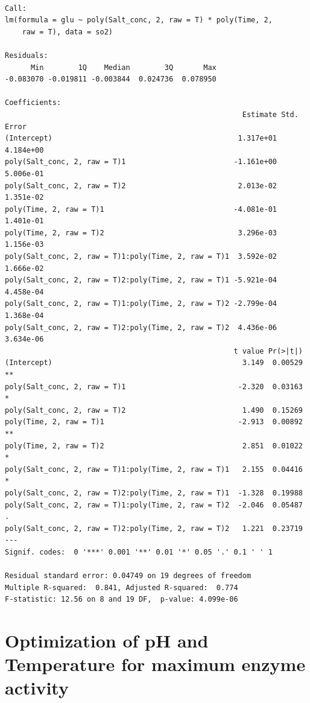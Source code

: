 \documentclass[
  12pt,
]{article}
\begin{document}
\begin{verbatim}

Call:
lm(formula = glu ~ poly(Salt_conc, 2, raw = T) * poly(Time, 2, 
    raw = T), data = so2)

Residuals:
      Min        1Q    Median        3Q       Max 
-0.083070 -0.019811 -0.003844  0.024736  0.078950 

Coefficients:
                                                       Estimate Std. Error
(Intercept)                                           1.317e+01  4.184e+00
poly(Salt_conc, 2, raw = T)1                         -1.161e+00  5.006e-01
poly(Salt_conc, 2, raw = T)2                          2.013e-02  1.351e-02
poly(Time, 2, raw = T)1                              -4.081e-01  1.401e-01
poly(Time, 2, raw = T)2                               3.296e-03  1.156e-03
poly(Salt_conc, 2, raw = T)1:poly(Time, 2, raw = T)1  3.592e-02  1.666e-02
poly(Salt_conc, 2, raw = T)2:poly(Time, 2, raw = T)1 -5.921e-04  4.458e-04
poly(Salt_conc, 2, raw = T)1:poly(Time, 2, raw = T)2 -2.799e-04  1.368e-04
poly(Salt_conc, 2, raw = T)2:poly(Time, 2, raw = T)2  4.436e-06  3.634e-06
                                                     t value Pr(>|t|)   
(Intercept)                                            3.149  0.00529 **
poly(Salt_conc, 2, raw = T)1                          -2.320  0.03163 * 
poly(Salt_conc, 2, raw = T)2                           1.490  0.15269   
poly(Time, 2, raw = T)1                               -2.913  0.00892 **
poly(Time, 2, raw = T)2                                2.851  0.01022 * 
poly(Salt_conc, 2, raw = T)1:poly(Time, 2, raw = T)1   2.155  0.04416 * 
poly(Salt_conc, 2, raw = T)2:poly(Time, 2, raw = T)1  -1.328  0.19988   
poly(Salt_conc, 2, raw = T)1:poly(Time, 2, raw = T)2  -2.046  0.05487 . 
poly(Salt_conc, 2, raw = T)2:poly(Time, 2, raw = T)2   1.221  0.23719   
---
Signif. codes:  0 '***' 0.001 '**' 0.01 '*' 0.05 '.' 0.1 ' ' 1

Residual standard error: 0.04749 on 19 degrees of freedom
Multiple R-squared:  0.841, Adjusted R-squared:  0.774 
F-statistic: 12.56 on 8 and 19 DF,  p-value: 4.099e-06
\end{verbatim}

\section{Optimization of pH and Temperature for maximum enzyme
activity}\label{optimization-of-ph-and-temperature-for-maximum-enzyme-activity}
\end{document}
